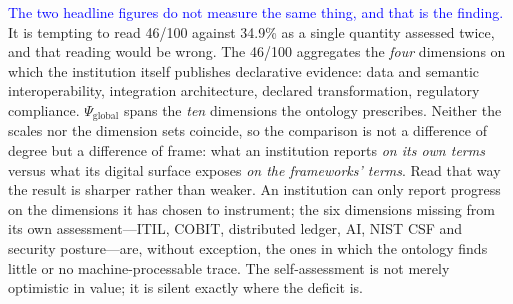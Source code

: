 \documentclass[engproc,proceedingpaper,submit,moreauthors]{Definitions/mdpi}
\begin{document}
    \textcolor{blue}{The two headline figures do not measure the same thing, and that is the finding.} It is tempting to read 46/100 against 34.9\% as a single quantity assessed twice, and that reading would be wrong. The 46/100 aggregates the \emph{four} dimensions on which the institution itself publishes declarative evidence: data and semantic interoperability, integration architecture, declared transformation, regulatory compliance. $\Psi_{\mathrm{global}}$ spans the \emph{ten} dimensions the ontology prescribes. Neither the scales nor the dimension sets coincide, so the comparison is not a difference of degree but a difference of frame: what an institution reports \emph{on its own terms} versus what its digital surface exposes \emph{on the frameworks' terms}. Read that way the result is sharper rather than weaker. An institution can only report progress on the dimensions it has chosen to instrument; the six dimensions missing from its own assessment---ITIL, COBIT, distributed ledger, AI, NIST CSF and security posture---are, without exception, the ones in which the ontology finds little or no machine-processable trace. The self-assessment is not merely optimistic in value; it is silent exactly where the deficit is.
\end{document}
